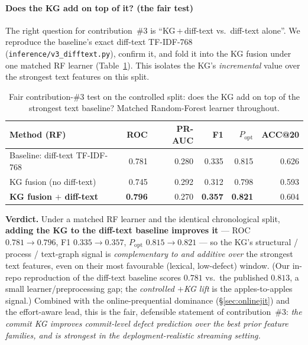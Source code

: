 \documentclass[11pt,a4paper]{article}
\begin{document}
	\paragraph{Does the KG add on top of it? (the fair test)} The right question for
	contribution~\#3 is ``KG\,$+$\,diff-text vs.\ diff-text alone''. We reproduce the
	baseline's exact diff-text TF-IDF-768 (\texttt{inference/v3\_difftext.py}), confirm
	it, and fold it into the KG fusion under one matched RF learner
	(Table~\ref{tab:v3difftext}). This isolates the KG's \emph{incremental} value over
	the strongest text features on this split.

	\begin{table}[H]\centering\small
	\caption{Fair contribution-\#3 test on the controlled split: does the KG add on top
	of the strongest text baseline? Matched Random-Forest learner throughout.}\label{tab:v3difftext}
	\begin{tabular}{@{}lrrrrr@{}}
	\toprule
	\textbf{Method (RF)} & \textbf{ROC} & \textbf{PR-AUC} & \textbf{F1} & \textbf{$P_{\mathrm{opt}}$} & \textbf{ACC@20}\\
	\midrule
	Baseline: diff-text TF-IDF-768   & 0.781 & 0.280 & 0.335 & 0.815 & 0.626\\
	KG fusion (no diff-text)         & 0.745 & 0.292 & 0.312 & 0.798 & 0.593\\
	\textbf{KG fusion $+$ diff-text} & \textbf{0.796} & 0.270 & \textbf{0.357} & \textbf{0.821} & 0.604\\
	\bottomrule
	\end{tabular}
	\end{table}

	\textbf{Verdict.} Under a matched RF learner and the identical chronological split,
	\textbf{adding the KG to the diff-text baseline improves it} --- ROC
	$0.781\!\rightarrow\!0.796$, F1 $0.335\!\rightarrow\!0.357$, $P_{\mathrm{opt}}$
	$0.815\!\rightarrow\!0.821$ --- so the KG's structural / process / text-graph signal
	is \emph{complementary to and additive over} the strongest text features, even on
	their most favourable (lexical, low-defect) window. (Our in-repo reproduction of the
	diff-text baseline scores $0.781$ vs.\ the published $0.813$, a small
	learner/preprocessing gap; the \emph{controlled $+$KG lift} is the apples-to-apples
	signal.) Combined with the online-prequential dominance (\S\ref{sec:onlinejit}) and
	the effort-aware lead, this is the fair, defensible statement of contribution~\#3:
	\emph{the commit KG improves commit-level defect prediction over the best prior
	feature families, and is strongest in the deployment-realistic streaming setting.}
\end{document}
